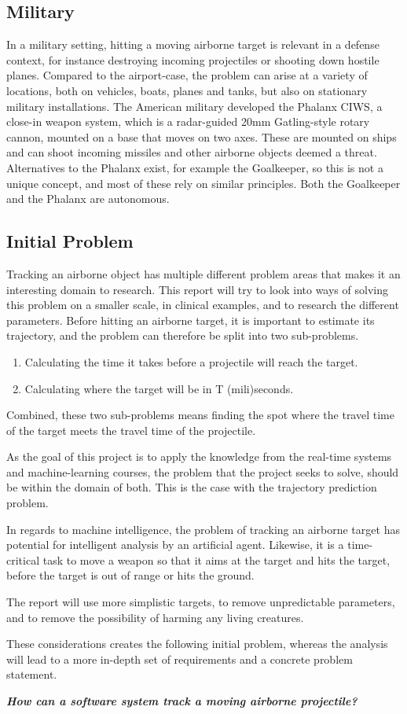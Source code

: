\subsection{Military}
In a military setting, hitting a moving airborne target is relevant in a defense context, for instance destroying incoming projectiles or shooting down hostile planes.
Compared to the airport-case, the problem can arise at a variety of locations, both on vehicles, boats, planes and tanks, but also on stationary military installations.
The American military developed the Phalanx CIWS, a close-in weapon system, which is a radar-guided 20mm Gatling-style rotary cannon, mounted on a base that moves on two axes.
These are mounted on ships and can shoot incoming missiles and other airborne objects deemed a threat.
Alternatives to the Phalanx exist, for example the Goalkeeper, so this is not a unique concept, and most of these rely on similar principles.
Both the Goalkeeper and the Phalanx are autonomous.

\subsection{Initial Problem}

Tracking an airborne object has multiple different problem areas that makes it an interesting domain to research.
This report will try to look into ways of solving this problem on a smaller scale, in clinical examples, and to research the different parameters.
Before hitting an airborne target, it is important to estimate its trajectory, and the problem can therefore be split into two sub-problems.
\begin{enumerate}
  \item Calculating the time it takes before a projectile will reach the target.
  \item Calculating where the target will be in T (mili)seconds.
\end{enumerate}
Combined, these two sub-problems means finding the spot where the travel time of the target meets the travel time of the projectile.


As the goal of this project is to apply the knowledge from the real-time systems and machine-learning courses, the problem that the project seeks to solve, should be within the domain of both.
This is the case with the trajectory prediction problem.


In regards to machine intelligence, the problem of tracking an airborne target has potential for intelligent analysis by an artificial agent.
Likewise, it is a time-critical task to move a weapon so that it aims at the target and hits the target, before the target is out of range or hits the ground.

The report will use more simplistic targets, to remove unpredictable parameters, and to remove the possibility of harming any living creatures.

These considerations creates the following initial problem, whereas the analysis will lead to a more in-depth set of requirements and a concrete problem statement.
\begin{center}
  \textit{\textbf{How can a software system track a moving airborne projectile?}}
\end{center}
